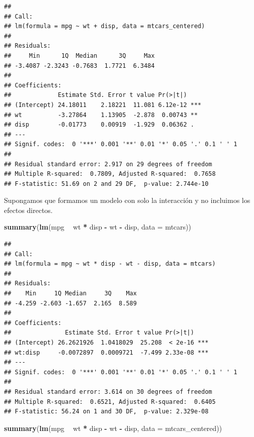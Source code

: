 \documentclass[
  12pt,
]{book}
\newenvironment{Shaded}{\begin{snugshade}}{\end{snugshade}}
\newcommand{\DataTypeTok}[1]{\textcolor[rgb]{0.13,0.29,0.53}{#1}}
\newcommand{\KeywordTok}[1]{\textcolor[rgb]{0.13,0.29,0.53}{\textbf{#1}}}
\newcommand{\NormalTok}[1]{#1}
\newcommand{\OperatorTok}[1]{\textcolor[rgb]{0.81,0.36,0.00}{\textbf{#1}}}
\newcommand{\StringTok}[1]{\textcolor[rgb]{0.31,0.60,0.02}{#1}}
\theoremstyle{definition}
\theoremstyle{definition}
\theoremstyle{definition}
\theoremstyle{remark}
\begin{document}
\begin{verbatim}
## 
## Call:
## lm(formula = mpg ~ wt + disp, data = mtcars_centered)
## 
## Residuals:
##     Min      1Q  Median      3Q     Max 
## -3.4087 -2.3243 -0.7683  1.7721  6.3484 
## 
## Coefficients:
##             Estimate Std. Error t value Pr(>|t|)    
## (Intercept) 24.18011    2.18221  11.081 6.12e-12 ***
## wt          -3.27864    1.13905  -2.878  0.00743 ** 
## disp        -0.01773    0.00919  -1.929  0.06362 .  
## ---
## Signif. codes:  0 '***' 0.001 '**' 0.01 '*' 0.05 '.' 0.1 ' ' 1
## 
## Residual standard error: 2.917 on 29 degrees of freedom
## Multiple R-squared:  0.7809, Adjusted R-squared:  0.7658 
## F-statistic: 51.69 on 2 and 29 DF,  p-value: 2.744e-10
\end{verbatim}

Supongamos que formamos un modelo con solo la interacción y no incluimos los efectos directos.

\begin{Shaded}
\begin{Highlighting}[]
\KeywordTok{summary}\NormalTok{(}\KeywordTok{lm}\NormalTok{(mpg }\OperatorTok{~}\StringTok{ }\NormalTok{wt }\OperatorTok{*}\StringTok{ }\NormalTok{disp }\OperatorTok{-}\StringTok{ }\NormalTok{wt }\OperatorTok{-}\StringTok{ }\NormalTok{disp, }\DataTypeTok{data =}\NormalTok{ mtcars))}
\end{Highlighting}
\end{Shaded}

\begin{verbatim}
## 
## Call:
## lm(formula = mpg ~ wt * disp - wt - disp, data = mtcars)
## 
## Residuals:
##    Min     1Q Median     3Q    Max 
## -4.259 -2.603 -1.657  2.165  8.589 
## 
## Coefficients:
##               Estimate Std. Error t value Pr(>|t|)    
## (Intercept) 26.2621926  1.0418029  25.208  < 2e-16 ***
## wt:disp     -0.0072897  0.0009721  -7.499 2.33e-08 ***
## ---
## Signif. codes:  0 '***' 0.001 '**' 0.01 '*' 0.05 '.' 0.1 ' ' 1
## 
## Residual standard error: 3.614 on 30 degrees of freedom
## Multiple R-squared:  0.6521, Adjusted R-squared:  0.6405 
## F-statistic: 56.24 on 1 and 30 DF,  p-value: 2.329e-08
\end{verbatim}

\begin{Shaded}
\begin{Highlighting}[]
\KeywordTok{summary}\NormalTok{(}\KeywordTok{lm}\NormalTok{(mpg }\OperatorTok{~}\StringTok{ }\NormalTok{wt }\OperatorTok{*}\StringTok{ }\NormalTok{disp }\OperatorTok{-}\StringTok{ }\NormalTok{wt }\OperatorTok{-}\StringTok{ }\NormalTok{disp, }\DataTypeTok{data =}\NormalTok{ mtcars_centered))}
\end{Highlighting}
\end{Shaded}
\end{document}
